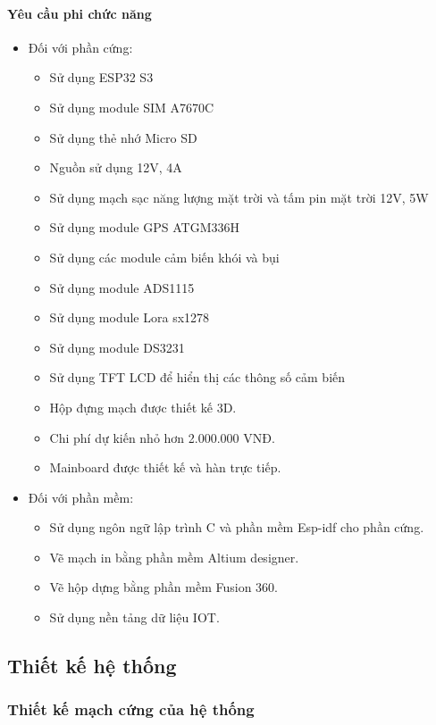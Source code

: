 \documentclass{article} %
\begin{document}
	\paragraph{Yêu cầu phi chức năng}\mbox{}
	\begin{itemize}
		
		
		\item Đối với phần cứng:
		\begin{itemize}[label=$\ast$]
			\item Sử dụng ESP32 S3
			\item Sử dụng module SIM A7670C
			\item Sử dụng thẻ nhớ Micro SD
			\item Nguồn sử dụng 12V, 4A
			\item Sử dụng mạch sạc năng lượng mặt trời và tấm pin mặt trời 12V, 5W
			\item Sử dụng module GPS ATGM336H
			\item Sử dụng các module cảm biến khói và bụi
			\item Sử dụng module ADS1115
			\item Sử dụng module Lora sx1278
			\item Sử dụng module DS3231
			\item Sử dụng TFT LCD để hiển thị các thông số cảm biến
			\item Hộp đựng mạch được thiết kế 3D.
			\item Chi phí dự kiến nhỏ hơn 2.000.000 VNĐ.
			\item Mainboard được thiết kế và hàn trực tiếp.
		\end{itemize}
		
		\item Đối với phần mềm:
		\begin{itemize}[label=$\ast$]
			\item Sử dụng ngôn ngữ lập trình C và phần mềm Esp-idf cho phần cứng.
			\item Vẽ mạch in bằng phần mềm Altium designer.
			\item Vẽ hộp dựng bằng phần mềm Fusion 360.
			\item Sử dụng nền tảng dữ liệu IOT.
		\end{itemize}
	\end{itemize}
	
	\subsection{Thiết kế hệ thống}
	\subsubsection{Thiết kế mạch cứng của hệ thống}
\end{document}
